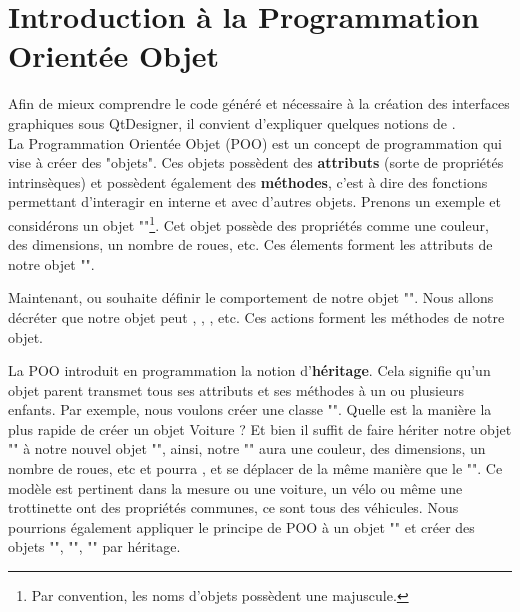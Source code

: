 {\section{Introduction à la Programmation Orientée Objet}
Afin de mieux comprendre le code généré et nécessaire à la création des interfaces graphiques sous QtDesigner, il convient d'expliquer quelques notions de . \\

La Programmation Orientée Objet (POO) est un concept de programmation qui vise à créer des "objets". \newline \newline
Ces objets possèdent des \textbf{attributs} (sorte de propriétés intrinsèques) et possèdent également des \textbf{méthodes}, c'est à dire des fonctions permettant d'interagir en interne et avec d'autres objets. \newline \newline
Prenons un exemple et considérons un objet ""\footnote{Par convention, les noms d'objets possèdent une majuscule.}. \newline
Cet objet possède des propriétés comme une couleur, des dimensions, un nombre de roues, etc. Ces élements forment les attributs de notre objet "". \newline


Maintenant, ou souhaite définir le comportement de notre objet "". Nous allons décréter que notre objet peut , , , etc.
Ces actions forment les méthodes de notre objet.\newline \newline



La POO introduit en programmation la notion d'\textbf{héritage}. \newline
Cela signifie qu'un objet parent transmet tous ses attributs et ses méthodes à un ou plusieurs enfants. \newline
Par exemple, nous voulons créer une classe "". Quelle est la manière la plus rapide de créer un objet Voiture ? Et bien il suffit de faire hériter notre objet "" à notre nouvel objet "", ainsi, notre "" aura une couleur, des dimensions, un nombre de roues, etc et pourra ,  et se déplacer de la même manière que le "". \newline Ce modèle est pertinent dans la mesure ou une voiture, un vélo ou même une trottinette ont des propriétés communes, ce sont tous des véhicules. \newline
Nous pourrions également appliquer le principe de POO à un objet "" et créer des objets "", "", "" par héritage. \newline


}
